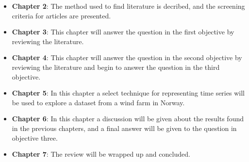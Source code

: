 \begin{itemize}
    \item \textbf{Chapter 2}: The method used to find literature is decribed, and the screening criteria for articles are presented.
    \item \textbf{Chapter 3}: This chapter will answer the question in the first objective by reviewing the literature.
    \item \textbf{Chapter 4}: This chapter will answer the question in the second objective by reviewing the literature and begin to answer the question in the third objective.
    \item \textbf{Chapter 5}: In this chapter a select technique for representing time series will be used to explore a dataset from a wind farm in Norway.
    \item \textbf{Chapter 6}: In this chapter a discussion will be given about the results found in the previous chapters, and a final answer will be given to the question in objective three.
    \item \textbf{Chapter 7}: The review will be wrapped up and concluded.
\end{itemize}

